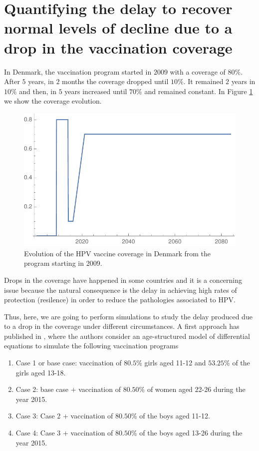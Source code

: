 \section{Quantifying the delay to recover normal levels of decline due to a drop in the vaccination coverage}\label{Resilence}
In Denmark, the vaccination program started in $2009$ with a coverage of $80\%$. After $5$ years, in $2$ months the coverage dropped until $10\%$. It remained $2$ years in $10\%$ and then, in $5$ years increased until $70\%$ and remained constant. In Figure \ref{fig:cobertura_danesa} we show the coverage evolution. 

\begin{figure}[h!]
	\centering
	\includegraphics[width=0.5\linewidth]{IMGs/11.-Resilencia/Cobertura_Danesa.pdf}
	\caption{Evolution of the HPV vaccine coverage in Denmark from the program starting in 2009.}
	\label{fig:cobertura_danesa}
\end{figure}

Drops in the coverage have happened in some countries and it is a concerning issue because the natural consequence is the delay in achieving high rates of protection (resilence) in order to reduce the pathologies associated to HPV.

Thus, here, we are going to perform simulations to study the delay produced due to a drop in the coverage under different circumstances. A first approach has published in \cite{Elfstrm2015}, where the authors consider an age-structured model of differential equations \cite{Baussano2013} to simulate the following vaccination programs

\begin{enumerate}
	\item Case 1 or base case: vaccination of $80.5\%$ girls aged 11-12 and $53.25\%$ of the girls aged 13-18.
	\item Case 2: base case $+$ vaccination of $80.50\%$ of women aged 22-26 during the year 2015.
	\item Case 3: Case 2 $+$ vaccination of $80.50\%$ of the boys aged 11-12.
	\item Case 4: Case 3 $+$ vaccination of $80.50\%$ of the boys aged 13-26 during the year 2015.
\end{enumerate}

